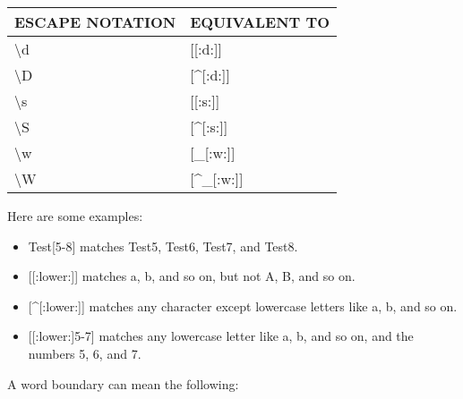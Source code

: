 \begin{longtable}{|l|l|}
\hline
\textbf{ESCAPE NOTATION} & \textbf{EQUIVALENT TO}              \\ \hline
\endfirsthead
%
\endhead
%
\textbackslash{}d        & {[}{[}:d:{]}{]}                     \\ \hline
\textbackslash{}D        & {[}\textasciicircum{}{[}:d:{]}{]}   \\ \hline
\textbackslash{}s        & {[}{[}:s:{]}{]}                     \\ \hline
\textbackslash{}S        & {[}\textasciicircum{}{[}:s:{]}{]}   \\ \hline
\textbackslash{}w        & {[}\_{[}:w:{]}{]}                   \\ \hline
\textbackslash{}W        & {[}\textasciicircum{}\_{[}:w:{]}{]} \\ \hline
\end{longtable}

Here are some examples:

\begin{itemize}
\item
Test[5-8] matches Test5, Test6, Test7, and Test8.

\item
{}[[:lower:]] matches a, b, and so on, but not A, B, and so on.

\item
{}[\^{}[:lower:]] matches any character except lowercase letters like a, b, and so on.

\item
{}[[:lower:]5-7] matches any lowercase letter like a, b, and so on, and the numbers 5, 6, and 7.
\end{itemize}


A word boundary can mean the following:

